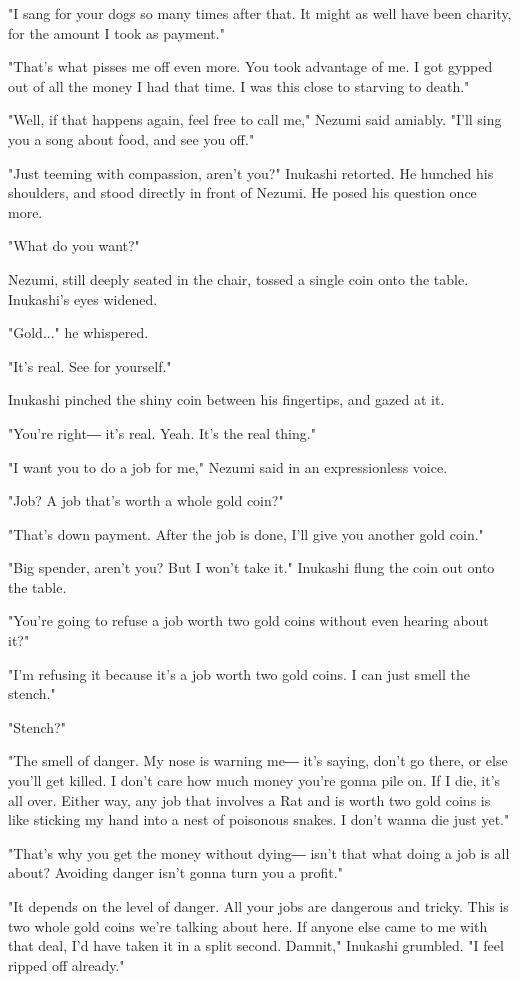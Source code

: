 "I sang for your dogs so many times after that. It might as well have
been charity, for the amount I took as payment."

"That's what pisses me off even more. You took advantage of me. I got
gypped out of all the money I had that time. I was this close to
starving to death."

"Well, if that happens again, feel free to call me," Nezumi said
amiably. "I'll sing you a song about food, and see you off."

"Just teeming with compassion, aren't you?" Inukashi retorted. He
hunched his shoulders, and stood directly in front of Nezumi. He posed
his question once more.

"What do you want?"

Nezumi, still deeply seated in the chair, tossed a single coin onto the
table. Inukashi's eyes widened.

"Gold..." he whispered.

"It's real. See for yourself."

Inukashi pinched the shiny coin between his fingertips, and gazed at it.

"You're right― it's real. Yeah. It's the real thing."

"I want you to do a job for me," Nezumi said in an expressionless voice.

"Job? A job that's worth a whole gold coin?"

"That's down payment. After the job is done, I'll give you another gold
coin."

"Big spender, aren't you? But I won't take it." Inukashi flung the coin
out onto the table.

"You're going to refuse a job worth two gold coins without even hearing
about it?"

"I'm refusing it because it's a job worth two gold coins. I can just
smell the stench."

"Stench?"

"The smell of danger. My nose is warning me― it's saying, don't go
there, or else you'll get killed. I don't care how much money you're
gonna pile on. If I die, it's all over. Either way, any job that
involves a Rat and is worth two gold coins is like sticking my hand into
a nest of poisonous snakes. I don't wanna die just yet."

"That's why you get the money without dying― isn't that what doing a job
is all about? Avoiding danger isn't gonna turn you a profit."

"It depends on the level of danger. All your jobs are dangerous and
tricky. This is two whole gold coins we're talking about here. If anyone
else came to me with that deal, I'd have taken it in a split second.
Damnit," Inukashi grumbled. "I feel ripped off already."

